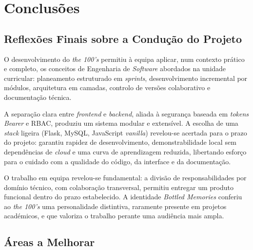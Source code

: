\documentclass[11pt,a4paper]{report}
\begin{document}
\chapter{Conclusões}\label{cap:conclusoes}

\section{Reflexões Finais sobre a Condução do Projeto}
O desenvolvimento do \textit{the 100's} permitiu à equipa aplicar, num contexto prático e completo, os conceitos de Engenharia de \textit{Software} abordados na unidade curricular: planeamento estruturado em \textit{sprints}, desenvolvimento incremental por módulos, arquitetura em camadas, controlo de versões colaborativo e documentação técnica.

A separação clara entre \textit{frontend} e \textit{backend}, aliada à segurança baseada em \textit{tokens Bearer} e RBAC, produziu um sistema modular e extensível. A escolha de uma \textit{stack} ligeira (Flask, MySQL, JavaScript \textit{vanilla}) revelou-se acertada para o prazo do projeto: garantiu rapidez de desenvolvimento, demonstrabilidade local sem dependências de \textit{cloud} e uma curva de aprendizagem reduzida, libertando esforço para o cuidado com a qualidade do código, da interface e da documentação.

O trabalho em equipa revelou-se fundamental: a divisão de responsabilidades por domínio técnico, com colaboração transversal, permitiu entregar um produto funcional dentro do prazo estabelecido. A identidade \textit{Bottled Memories} conferiu ao \textit{the 100's} uma personalidade distintiva, raramente presente em projetos académicos, e que valoriza o trabalho perante uma audiência mais ampla.

\section{Áreas a Melhorar}
\end{document}
